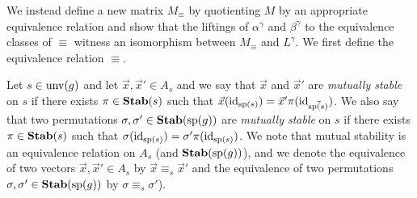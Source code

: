 \documentclass[../paper.tex]{subfiles}
\begin{document}
We instead define a new matrix $M_{\equiv}$ by quotienting $M$ by an appropriate
equivalence relation and show that the liftings of $\alpha^{\gamma}$ and
$\beta^{\gamma}$ to the equivalence classes of $\equiv$ witness an
isomorphism between $M_\equiv$ and $L^{\gamma}$. We first define the
equivalence relation $\equiv$.

Let $s \in \text{unv}(g)$ and let $\vec{x}, \vec{x}' \in A_s$ and we say that
$\vec{x}$ and $\vec{x}'$ are \emph{mutually stable} on $s$ if there exists $\pi
\in \text{\textbf{Stab}}(s)$ such that $\vec{x} (\operatorname{id}_{\text{sp}(s)}) = \vec{x}'\pi
(\operatorname{id}_{\vec{\text{sp}(s)}})$. We also say that two permutations $\sigma, \sigma' \in
\text{\textbf{Stab}} (\text{sp} (g))$ are \emph{mutually stable} on $s$ if there exists $\pi \in \text{\textbf{Stab}}(s)$
such that $\sigma (\operatorname{id}_{\text{sp}(s)}) = \sigma' \pi (\operatorname{id}_{\text{sp}(s)}) $. We note
that mutual stability is an equivalence relation on $A_s$ (and $\text{\textbf{Stab}} (\text{sp} (g))$),
and we denote the equivalence of two vectors $\vec{x}, \vec{x}' \in A_s$ by
$\vec{x} \equiv_s \vec{x}'$ and the equivalence of two permutations $\sigma,
\sigma' \in \text{\textbf{Stab}} (\text{sp} (g))$ by $\sigma \equiv_s \sigma'$).





\end{document}
